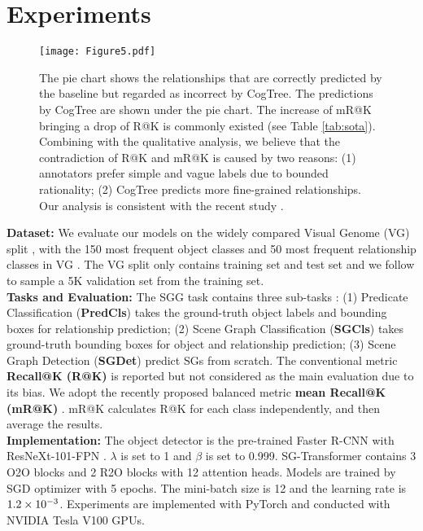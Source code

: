 \documentclass{article}
\begin{document}
\section{Experiments}
\label{sec:experiments}




\iffalse
\begin{figure}[th]
    \centering
    \texttt{[image: figure/induced-tree.png]}
    \caption{Cognition tree structure.}
    \label{fig:trees}
\end{figure}
\fi

\begin{figure}[t]
    \centering
    \texttt{[image: Figure5.pdf]}
    \caption{The pie chart shows the relationships that are correctly predicted by the baseline but regarded as incorrect by CogTree. The predictions by CogTree are shown under the pie chart. The increase of mR@K bringing a drop of R@K is commonly existed (see Table \ref{tab:sota}). Combining with the qualitative analysis, we believe that the contradiction of R@K and mR@K is caused by two reasons: (1) annotators prefer simple and vague  labels due to bounded rationality\protect\cite{simon1990bounded}; (2) CogTree predicts more fine-grained  relationships. Our analysis is consistent with the recent study \protect\cite{Tang2020Unbiased}.} 
    \label{fig:tsne}
\end{figure}

\textbf{Dataset:} We evaluate our models on 
the widely compared Visual Genome (VG) split \cite{xu2017scene},
with the 150 most frequent object classes and 50 most frequent relationship classes in VG \cite{krishna2017visual}. The VG split only contains training set and test set and we follow \cite{zellers2018neural} to sample a 5K validation set from the training set.
\\
\textbf{Tasks and Evaluation:} The SGG task contains three sub-tasks \cite{zellers2018neural}: (1) Predicate Classification (\textbf{PredCls}) takes the ground-truth object labels and bounding boxes for relationship prediction; (2) Scene Graph Classification (\textbf{SGCls}) takes ground-truth bounding boxes for object and relationship prediction; (3) Scene Graph Detection (\textbf{SGDet}) predict SGs from scratch. 
The conventional metric \textbf{Recall@K (R@K)} is reported but not considered as the main evaluation due to its bias. 
We adopt the recently proposed balanced metric \textbf{mean Recall@K  (mR@K)} \cite{chen2019knowledge,tang2019learning}. mR@K calculates R@K for each class independently, and then average the results.  
\\
\textbf{Implementation:} The object detector is the pre-trained Faster R-CNN \cite{ren2015faster} with ResNeXt-101-FPN \cite{Lin2017Feature}. $\lambda$ is set to 1 and $\beta$ is set to 0.999. SG-Transformer contains 3 O2O blocks and 2 R2O blocks with 12 attention heads. Models are trained by SGD optimizer with 5 epochs. The mini-batch size is 12 and the learning rate is ${\rm 1.2\times10^{-3}}$.  Experiments are implemented with PyTorch and conducted with NVIDIA Tesla V100 GPUs.   
\end{document}
